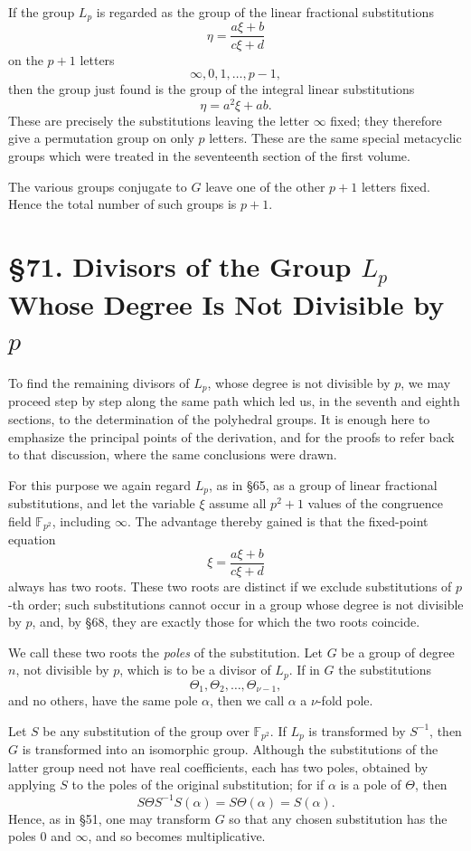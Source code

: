 \documentclass[11pt,a4paper]{book}
\newcommand{\webersection}[2]{\clearpage\section*{\S #1. #2}}
\newcommand{\F}{\mathbb F}
\begin{document}
If the group \(L_p\) is regarded as the group of the linear fractional substitutions
\[
 \eta=\frac{a\xi+b}{c\xi+d}
\]
on the \(p+1\) letters
\[
 \infty,0,1,\ldots,p-1,
\]
then the group just found is the group of the integral linear substitutions
\[
 \eta=a^2\xi+ab .
\]
These are precisely the substitutions leaving the letter \(\infty\) fixed; they therefore give a permutation group on only \(p\) letters.  These are the same special metacyclic groups which were treated in the seventeenth section of the first volume.

The various groups conjugate to \(G\) leave one of the other \(p+1\) letters fixed.  Hence the total number of such groups is \(p+1\).

\webersection{71}{Divisors of the Group \(L_p\) Whose Degree Is Not Divisible by \(p\)}

To find the remaining divisors of \(L_p\), whose degree is not divisible by \(p\), we may proceed step by step along the same path which led us, in the seventh and eighth sections, to the determination of the polyhedral groups.  It is enough here to emphasize the principal points of the derivation, and for the proofs to refer back to that discussion, where the same conclusions were drawn.

For this purpose we again regard \(L_p\), as in \S 65, as a group of linear fractional substitutions, and let the variable \(\xi\) assume all \(p^2+1\) values of the congruence field \(\F_{p^2}\), including \(\infty\).  The advantage thereby gained is that the fixed-point equation
\[
 \xi=\frac{a\xi+b}{c\xi+d}
\]
always has two roots.  These two roots are distinct if we exclude substitutions of \(p\)-th order; such substitutions cannot occur in a group whose degree is not divisible by \(p\), and, by \S 68, they are exactly those for which the two roots coincide.

We call these two roots the \emph{poles} of the substitution.  Let \(G\) be a group of degree \(n\), not divisible by \(p\), which is to be a divisor of \(L_p\).  If in \(G\) the substitutions
\[
 \Theta_1,\Theta_2,\ldots,\Theta_{\nu-1},
\]
and no others, have the same pole \(\alpha\), then we call \(\alpha\) a \(\nu\)-fold pole.

Let \(S\) be any substitution of the group over \(\F_{p^2}\).  If \(L_p\) is transformed by \(S^{-1}\), then \(G\) is transformed into an isomorphic group.  Although the substitutions of the latter group need not have real coefficients, each has two poles, obtained by applying \(S\) to the poles of the original substitution; for if \(\alpha\) is a pole of \(\Theta\), then
\[
 S\Theta S^{-1}S(\alpha)=S\Theta(\alpha)=S(\alpha).
\]
Hence, as in \S 51, one may transform \(G\) so that any chosen substitution has the poles \(0\) and \(\infty\), and so becomes multiplicative.
\end{document}
